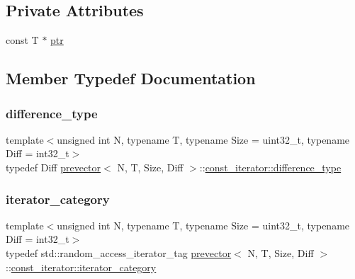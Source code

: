 \subsection*{Private Attributes}
\begin{DoxyCompactItemize}
\item 
const T $\ast$ \mbox{\hyperlink{classprevector_1_1const__iterator_a3946bd001894988f6881f7ea5f108c87}{ptr}}
\end{DoxyCompactItemize}


\subsection{Member Typedef Documentation}
\mbox{\label{classprevector_1_1const__iterator_a8c3d9b22578d2b87f14513d523b151e9}} 
\subsubsection{\texorpdfstring{difference\+\_\+type}{difference\_type}}
{\footnotesize\ttfamily template$<$unsigned int N, typename T, typename Size = uint32\+\_\+t, typename Diff = int32\+\_\+t$>$ \\
typedef Diff \mbox{\hyperlink{classprevector}{prevector}}$<$ N, T, Size, Diff $>$\+::\mbox{\hyperlink{classprevector_1_1const__iterator_a8c3d9b22578d2b87f14513d523b151e9}{const\+\_\+iterator\+::difference\+\_\+type}}}

\mbox{\label{classprevector_1_1const__iterator_a378da53ceeb29f7e1c9370fe99f0df50}} 
\subsubsection{\texorpdfstring{iterator\+\_\+category}{iterator\_category}}
{\footnotesize\ttfamily template$<$unsigned int N, typename T, typename Size = uint32\+\_\+t, typename Diff = int32\+\_\+t$>$ \\
typedef std\+::random\+\_\+access\+\_\+iterator\+\_\+tag \mbox{\hyperlink{classprevector}{prevector}}$<$ N, T, Size, Diff $>$\+::\mbox{\hyperlink{classprevector_1_1const__iterator_a378da53ceeb29f7e1c9370fe99f0df50}{const\+\_\+iterator\+::iterator\+\_\+category}}}


